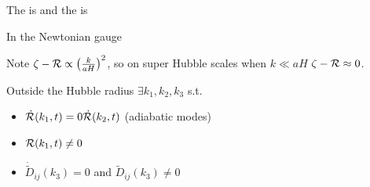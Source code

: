 \documentclass{article}
\begin{document}
\begin{definition}
The  is 
and the  is 
\end{definition}

\begin{prop}
In the Newtonian gauge 
\end{prop}

Note $\zeta-\mathcal{R} \propto \left(\frac{k}{aH}\right)^2$, so on super Hubble scales when $k\ll aH$ $\zeta-\mathcal{R} \approx0$.

\begin{theorem}
Outside the Hubble radius $\exists k_1, k_2, k_3$ s.t. 
\begin{itemize}
    \item $\dot{\mathcal{R}}(k_1,t) = 0 \dot{\mathcal{R}}(k_2,t)$ (adiabatic modes) 
    \item $\mathcal{R}(k_1,t) \neq 0$
    \item $\dot{\tilde{D}}_{ij}(k_3) = 0$ and $\tilde{D}_{ij}(k_3) \neq 0$
\end{itemize}
\end{theorem}
\end{document}
